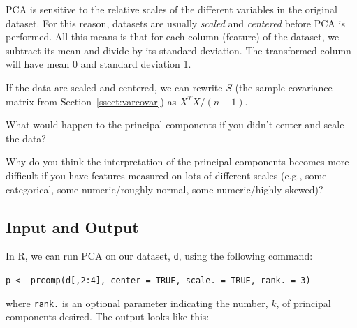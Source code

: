 PCA is sensitive to the relative scales of the different variables in the original dataset. For this reason, datasets are usually \emph{scaled} and \emph{centered} before PCA is performed. All this means is that for each column (feature) of the dataset, we subtract its mean and divide by its standard deviation. The transformed column will have mean 0 and standard deviation 1. 

If the data are scaled and centered, we can rewrite $S$ (the sample covariance matrix from Section~\ref{ssect:varcovar}) as $X^T X/(n-1)$.

\vspace{2mm}

\begin{question}{}
What would happen to the principal components if you didn't center and scale the data?
\end{question}

\begin{question}{}
Why do you think the interpretation of the principal components becomes more difficult if you have features measured on lots of different scales (e.g., some categorical, some numeric/roughly normal, some numeric/highly skewed)? 
\end{question}

\subsection{Input and Output}

In R, we can run PCA on our dataset, \texttt{d}, using the following command:
\begin{center}
\verb|p <- prcomp(d[,2:4], center = TRUE, scale. = TRUE, rank. = 3)|
\end{center}
where \texttt{rank.} is an optional parameter indicating the number, $k$, of principal components desired. The output looks like this:

